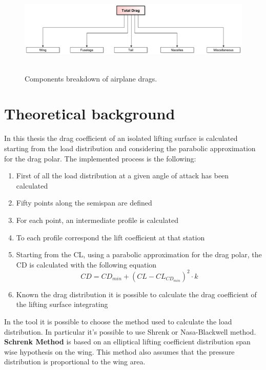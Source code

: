 \begin{figure}[H]
\centering
{\includegraphics[height=3.6cm]{Immagini/dragco.pdf}} 
\caption{Components breakdown of airplane drags.}
\end{figure}

\section{Theoretical background}

In this thesis the drag coefficient of an isolated lifting surface is calculated starting from the load distribution and considering the parabolic approximation for the drag polar. The implemented process is the following:

\begin{enumerate}
\item First of all the load distribution at a given angle of attack has been calculated
\item Fifty points along the semispan are defined
\item For each point, an intermediate profile is calculated
\item To each profile correspond the lift coefficient at that station
\item Starting from the CL, using a parabolic approximation for the drag polar, the CD is calculated with the following equation
\begin{equation}
CD = CD_{min} + (CL - CL_{CD_{min}})^2 \cdot k
\end{equation}
\item Known the drag distribution it is possible to calculate the drag coefficient of the lifting surface integrating
\end{enumerate}

In the tool it is possible to choose the method used to calculate the load distribution. In particular it's possible to use Shrenk or Nasa-Blackwell method.\\

{\bfseries Schrenk Method} is based on an elliptical lifting coefficient distribution span wise hypothesis on the wing. This method also assumes that the pressure distribution is proportional to the wing area. \\ 

